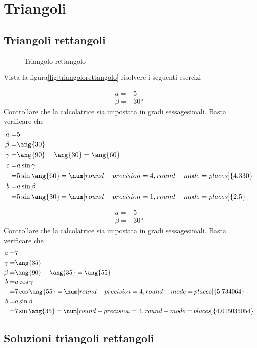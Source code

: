 \chapter{Triangoli}
\label{cha:trigonometriatriangoli}
 \section{Triangoli rettangoli}
\begin{figure}
	\centering
	
	\caption{Triangolo rettangolo}
	\label{fig:triangolorettangolo}
\end{figure}
Vista la figura\nobs\vref{fig:triangolorettangolo} risolvere i seguenti esercizi
 \tcbstartrecording
 \begin{exercise}
 	\begin{align*}
 	a=&5\\
 	\beta=&\ang{30}
 	\end{align*}
\tcblower
Controllare che la calcolatrice sia impostata in gradi sessagesimali.
Basta verificare che \testgradi 
\begin{align*}
a=&5\\
\beta=&\ang{30}\\
\gamma=&\ang{90}-\ang{30}=\ang{60}\\
c=&a\sin\gamma\\
=& 5\sin\ang{60}=\num[round-precision=\lungarrotandamento,round-mode=places]{4.330}\\
b=&a\sin\beta\\
=& 5\sin\ang{30}=\num[round-precision=1,round-mode=places]{2.5}
\end{align*}
 \end{exercise}
 
  \begin{exercise}
  	\begin{align*}
  	a=&5\\
  	\beta=&\ang{30}
  	\end{align*}
  	\tcblower
  	Controllare che la calcolatrice sia impostata in gradi sessagesimali.
  	Basta verificare che \testgradi 
  	\begin{align*}
  	a=& 7\\
  	\gamma=&\ang{35}\\
  	\beta=&\ang{90}-\ang{35}=\ang{55}\\
  	b=&a\cos\gamma\\
  	=& 7\cos\ang{55}=\num[round-precision=\lungarrotandamento,round-mode=places]{5.734064}\\
  	b=&a\sin\beta\\
  	=& 7\sin\ang{35}=\num[round-precision=\lungarrotandamento,round-mode=places]{4.015035054}
  	\end{align*}
  \end{exercise}
\tcbstoprecording
 \newpage
 \section{Soluzioni triangoli rettangoli}
 \tcbinputrecords